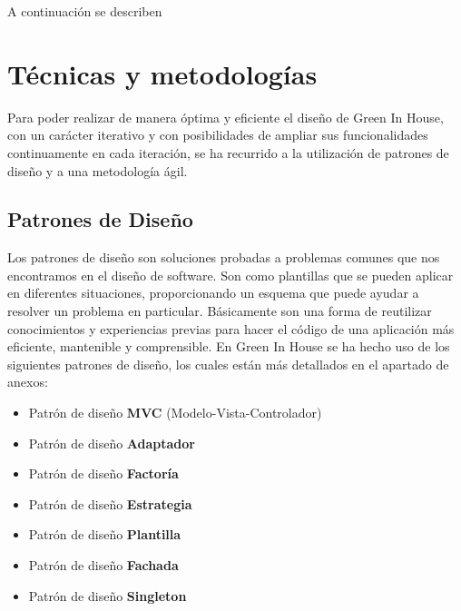 A continuación se describen 

\section{Técnicas y metodologías}
Para poder realizar de manera óptima y eficiente el diseño de Green In House, con un carácter iterativo y con posibilidades de ampliar sus funcionalidades continuamente en cada iteración, se ha recurrido a la utilización de patrones de diseño y a una metodología ágil. 

    \subsection{Patrones de Diseño}
    Los patrones de diseño \cite{wiki:patrones_de_diseño} son soluciones probadas a problemas comunes que nos encontramos en el diseño de software. Son como plantillas que se pueden aplicar en diferentes situaciones, proporcionando un esquema que puede ayudar a resolver un problema en particular. Básicamente son una forma de reutilizar conocimientos y experiencias previas para hacer el código de una aplicación más eficiente, mantenible y comprensible.
    En Green In House se ha hecho uso de los siguientes patrones de diseño, los cuales están más detallados en el apartado de anexos:
    \begin{itemize}                
        \item Patrón de diseño \textbf{MVC} (Modelo-Vista-Controlador)
        \item Patrón de diseño \textbf{Adaptador}
        \item Patrón de diseño \textbf{Factoría}
        \item Patrón de diseño \textbf{Estrategia}
        \item Patrón de diseño \textbf{Plantilla}
        \item Patrón de diseño \textbf{Fachada}
        \item Patrón de diseño \textbf{Singleton}
    \end{itemize} 

